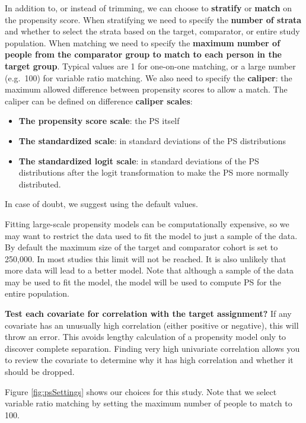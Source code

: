 \documentclass[11pt]{book}
\providecommand{\tightlist}{%
  \setlength{\itemsep}{0pt}\setlength{\parskip}{0pt}}
\begin{document}
In addition to, or instead of trimming, we can choose to
\textbf{stratify} or \textbf{match} on the propensity score. When
stratifying we need to specify the \textbf{number of strata} and whether
to select the strata based on the target, comparator, or entire study
population. When matching we need to specify the \textbf{maximum number
of people from the comparator group to match to each person in the
target group}. Typical values are 1 for one-on-one matching, or a large
number (e.g.~100) for variable ratio matching. We also need to specify
the \textbf{caliper}: the maximum allowed difference between propensity
scores to allow a match. The caliper can be defined on difference
\textbf{caliper scales}:

\begin{itemize}
\tightlist
\item
  \textbf{The propensity score scale}: the PS itself
\item
  \textbf{The standardized scale}: in standard deviations of the PS
  distributions
\item
  \textbf{The standardized logit scale}: in standard deviations of the
  PS distributions after the logit transformation to make the PS more
  normally distributed.
\end{itemize}

In case of doubt, we suggest using the default values.

Fitting large-scale propensity models can be computationally expensive,
so we may want to restrict the data used to fit the model to just a
sample of the data. By default the maximum size of the target and
comparator cohort is set to 250,000. In most studies this limit will not
be reached. It is also unlikely that more data will lead to a better
model. Note that although a sample of the data may be used to fit the
model, the model will be used to compute PS for the entire population.

\textbf{Test each covariate for correlation with the target assignment?}
If any covariate has an unusually high correlation (either positive or
negative), this will throw an error. This avoids lengthy calculation of
a propensity model only to discover complete separation. Finding very
high univariate correlation allows you to review the covariate to
determine why it has high correlation and whether it should be dropped.

Figure \ref{fig:psSettings} shows our choices for this study. Note that
we select variable ratio matching by setting the maximum number of
people to match to 100.
\end{document}
